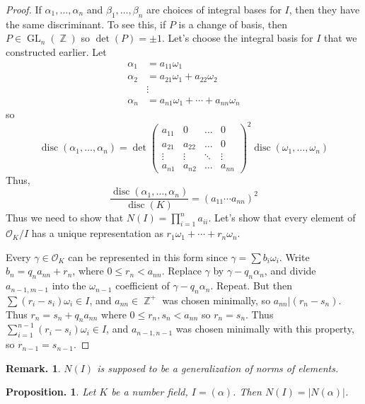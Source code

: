\documentclass[11pt, a4paper]{memoir}
\DeclareMathOperator{\Z}{{\mathbb{Z}}}
\theoremstyle{change}
\newtheorem{proposition}[theorem]{Proposition.}
\theoremstyle{plain}
\theoremstyle{nonumberplain}
\newtheorem{remark}{Remark.}
\newtheorem{proof}{Proof}
\DeclareMathOperator{\disc}{disc}
\DeclareMathOperator{\GL}{GL}
\numberwithin{equation}{section}
\begin{document}
\begin{proof}
    If $\alpha_1,\ldots,\alpha_n$ and $\beta_1,\ldots,\beta_n$ are choices of integral bases for $I$, then they have the same discriminant.
    To see this, if $P$ is a change of basis, then $P\in\GL_n(\Z)$ so $\det(P)=\pm 1$.
    Let's choose the integral basis for $I$ that we constructed earlier.
    Let
    \begin{align*}
        \alpha_1 &= a_{11}\omega_1\\
        \alpha_2 &= a_{21}\omega_1+a_{22}\omega_2\\
                 &\vdots\\
        \alpha_n &= a_{n1}\omega_1+\cdots+a_{nn}\omega_n
    \end{align*}
    so
    \begin{equation*}
        \disc(\alpha_1,\ldots,\alpha_n) = \det
        \begin{pmatrix}a_{11}&0&\hdots&0\\a_{21}&a_{22}&\hdots&0\\\vdots&\vdots&\ddots&\vdots\\a_{n1}&a_{n2}&\hdots&a_{nn}\end{pmatrix}^2\disc(\omega_1,\ldots,\omega_n)
    \end{equation*}
    Thus,
    \begin{equation*}
        \frac{\disc(\alpha_1,\ldots,\alpha_n)}{\disc(K)}=(a_{11}\cdots a_{nn})^2
    \end{equation*}
    Thus we need to show that $N(I)=\prod_{i=1}^n a_{ii}$.
    Let's show that every element of $\mathcal{O}_K/I$ has a unique representation as $r_1\omega_1+\cdots+r_n\omega_n$.

    Every $\gamma\in\mathcal{O}_K$ can be represented in this form since $\gamma=\sum b_i\omega_i$.
    Write $b_n=q_na_{nn}+r_n$, where $0\leq r_n<a_{nn}$.
    Replace $\gamma$ by $\gamma-q_n\alpha_n$, and divide $a_{n-1,m-1}$ into the $\omega_{n-1}$ coefficient of $\gamma-q_n\alpha_n$.
    Repeat.
    But then $\sum(r_i-s_i)\omega_i\in I$, and $a_{nn}\in\Z^+$ was chosen minimally, so $a_{nn}|(r_n-s_n)$.
    Thus $r_n=s_n+q_na_{nn}$ where $0\leq r_n,s_n<a_{nn}$ so $r_n=s_n$.
    Thus $\sum_{i=1}^{n-1}(r_i-s_i)\omega_i\in I$, and $a_{n-1,n-1}$ was chosen minimally with this property, so $r_{n-1}=s_{n-1}$.
\end{proof}
\begin{remark}
    $N(I)$ is supposed to be a generalization of norms of elements.
\end{remark}
\begin{proposition}
    Let $K$ be a number field, $I=(\alpha)$.
    Then $N(I)=|N(\alpha)|$.
\end{proposition}
\end{document}
